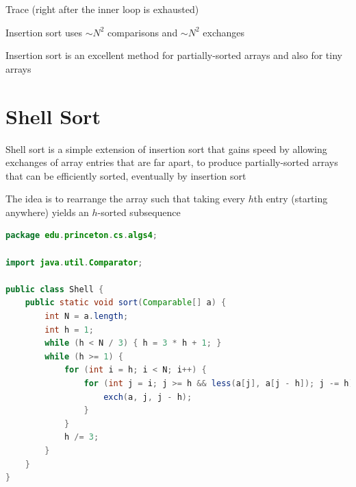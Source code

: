 \documentclass[8pt,a4paper,compress]{beamer}
\begin{document}
\begin{frame}[fragile]
\pause

Trace (right after the inner loop is exhausted)
\begin{center}
\end{center}
\end{frame}

\begin{frame}[fragile]
\pause

Insertion sort uses $\sim N^2$ comparisons and $\sim N^2$ exchanges

\pause
\bigskip

Insertion sort is an excellent method for partially-sorted arrays and also for tiny arrays
\end{frame}

\section{Shell Sort}
\begin{frame}[fragile]
\pause

Shell sort is a simple extension of insertion sort that gains speed by allowing exchanges of array entries that are far apart, to produce partially-sorted arrays that can be efficiently sorted, eventually by insertion sort

\pause
\bigskip

The idea is to rearrange the array such that taking every $h$th entry (starting anywhere) yields an $h$-sorted subsequence

\pause
\bigskip

\begin{lstlisting}[language=Java,style=focusin]
package edu.princeton.cs.algs4;

import java.util.Comparator;

public class Shell {
    public static void sort(Comparable[] a) {
        int N = a.length; 
        int h = 1;
        while (h < N / 3) { h = 3 * h + 1; }
        while (h >= 1) {
            for (int i = h; i < N; i++) {
                for (int j = i; j >= h && less(a[j], a[j - h]); j -= h) {
                    exch(a, j, j - h);
                }
            }
            h /= 3;
        }    
    }
}
\end{lstlisting}
\end{frame}
\end{document}
